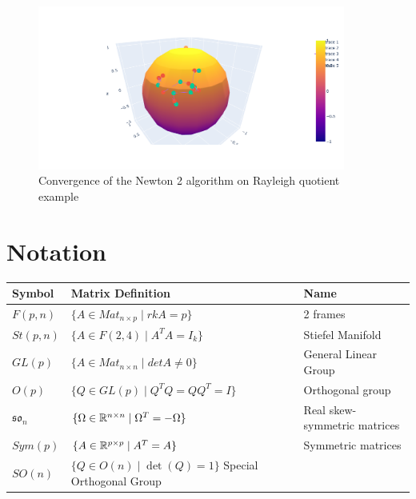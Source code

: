 \documentclass[11pt,a4paper]{report}
\begin{document}
\begin{figure}[h] \label{gradR2}
    \centering
    \includegraphics[width=0.90\textwidth]{newton2.png}
    \caption{Convergence of the Newton 2 algorithm on Rayleigh quotient example}
\end{figure}
\chapter{Notation}  
\noindent\begin{tabularx}{\textwidth}{@{}XXX@{}}  \toprule
  Symbol & Matrix Definition & Name \\
  \toprule
  $F(p,n)$  & $\{A \in Mat_{n \times p}  \; | \; rkA = p  \} $ & 2 frames \\
  \toprule
  $St(p,n)$ & $ \{ A \in F(2,4) \; | \; A^T A = I_k \} $ & Stiefel Manifold \\
  \toprule
  $ GL(p)$ &  $ \{ A \in Mat_{n \times n} \; | \; det A \neq 0 \}$ & General Linear Group \\
  \toprule
  $ O(p)$ & $ \{ Q \in GL(p) \; | \; Q^T Q = Q Q^T = I \}$  & Orthogonal group \\
  \toprule
  $ \mathfrak{so}_n $ & $ \{ \Omega \in \mathbb{R}^{n \times n} \; | \; \Omega^T = - \Omega \} $ & Real skew-symmetric matrices \\
  \toprule
  $ Sym(p) $ & $ \{ A \in \mathbb{R}^{p \times p} \; | \; A^T = A \} $ & Symmetric matrices \\
  \toprule
  $ SO(n) $ & $ \{ Q \in O(n) \; | \; \det(Q) = 1 \} $ Special Orthogonal Group \\
\end{tabularx}\offinterlineskip
\end{document}
